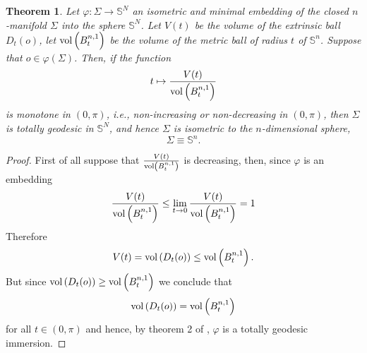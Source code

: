 \documentclass{amsart}
\newtheorem*{theorem*}{Theorem}
\theoremstyle{definition}
\theoremstyle{remark}
\begin{document}
 \begin{theorem*}\label{teo2}Let $\varphi:\Sigma\to\mathbb{S}^N$ an isometric and minimal embedding of the closed $n$-manifold $\Sigma$ into the sphere $\mathbb{S}^N$.  Let $V(t)$ be the volume of the extrinsic ball $D_t(o)$, let ${\rm vol}\left(B^{n,1}_t\right)$ be the volume of the metric ball of radius $t$ of $\mathbb{S}^n$.
 Suppose that $o\in \varphi(\Sigma)$.  Then, if the function
 $$
 t\mapsto \frac{V(t)}{{\rm vol}\left(B^{n,1}_t\right)}
 $$
 is monotone in $(0,\pi)$, \emph{i.e.}, non-increasing or non-decreasing in $(0,\pi)$, then $\Sigma$ is totally geodesic in $\mathbb{S}^N$, and hence $\Sigma$ is isometric to the $n$-dimensional sphere, $$\Sigma\equiv \mathbb{S}^n.$$
 \end{theorem*}
 \begin{proof}
 First of all suppose that $\frac{V(t)}{{\rm vol}\left(B^{n,1}_t\right)}$ is decreasing, then, since $\varphi$ is an embedding
 $$
 \frac{V(t)}{{\rm vol}\left(B^{n,1}_t\right)}\leq \lim_{t\to 0}\frac{V(t)}{{\rm vol}\left(B^{n,1}_t\right)}=1
 $$
 Therefore 
 $$
 V(t)={\rm vol}\left(D_t(o)\right)\leq {\rm vol}\left(B^{n,1}_t\right). 
 $$
 But since ${\rm vol}\left(D_t(o)\right)\geq {\rm vol}\left(B^{n,1}_t\right) $ we conclude that 
 $$
 {\rm vol}\left(D_t(o)\right)={\rm vol}\left(B^{n,1}_t\right)
 $$
 for all $t\in (0,\pi)$ and hence, by theorem 2 of \cite{Markvorsen2002101}, $\varphi$ is a totally geodesic immersion.  
 

\end{proof}
\end{document}
